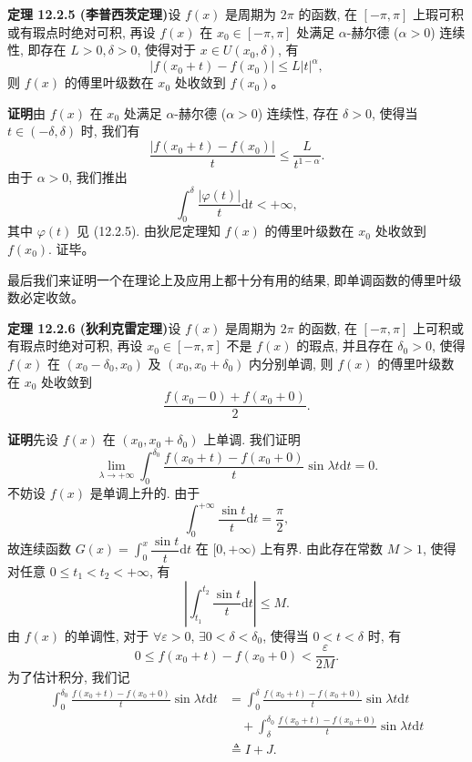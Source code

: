 \documentclass[UTF8, 12pt, fontset=fandol, oneside]{ctexart}
\begin{document}
\noindent\textbf{定理 12.2.5 (李普西茨定理)}\quad 设 $f(x)$ 是周期为 $2\pi$ 的函数, 在 $[-\pi,\pi]$ 上瑕可积或有瑕点时绝对可积, 再设 $f(x)$ 在 $x_0\in[-\pi,\pi]$ 处满足 $\alpha$-赫尔德 ($\alpha>0$) 连续性, 即存在 $L>0,\delta>0$, 使得对于 $x\in U(x_0,\delta)$, 有
\[
  |f(x_0+t)-f(x_0)|\leqslant L|t|^\alpha,
\]
则 $f(x)$ 的傅里叶级数在 $x_0$ 处收敛到 $f(x_0)$。

\noindent\textbf{证明}\quad 由 $f(x)$ 在 $x_0$ 处满足 $\alpha$-赫尔德 ($\alpha>0$) 连续性, 存在 $\delta>0$, 使得当 $t\in(-\delta,\delta)$ 时, 我们有
\[
  \frac{|f(x_0+t)-f(x_0)|}{t}\leqslant\frac{L}{t^{1-\alpha}}.
\]
由于 $\alpha>0$, 我们推出
\[
  \int_0^\delta\frac{|\varphi(t)|}{t}\mathrm dt<+\infty,
\]
其中 $\varphi(t)$ 见 (12.2.5). 由狄尼定理知 $f(x)$ 的傅里叶级数在 $x_0$ 处收敛到 $f(x_0)$. 证毕。

最后我们来证明一个在理论上及应用上都十分有用的结果, 即单调函数的傅里叶级数必定收敛。

\noindent\textbf{定理 12.2.6 (狄利克雷定理)}\quad 设 $f(x)$ 是周期为 $2\pi$ 的函数, 在 $[-\pi,\pi]$ 上可积或有瑕点时绝对可积, 再设 $x_0\in[-\pi,\pi]$ 不是 $f(x)$ 的瑕点, 并且存在 $\delta_0>0$, 使得 $f(x)$ 在 $(x_0-\delta_0,x_0)$ 及 $(x_0,x_0+\delta_0)$ 内分别单调, 则 $f(x)$ 的傅里叶级数在 $x_0$ 处收敛到
\[
  \frac{f(x_0-0)+f(x_0+0)}{2}.
\]

\noindent\textbf{证明}\quad 先设 $f(x)$ 在 $(x_0,x_0+\delta_0)$ 上单调. 我们证明
\begin{equation}
  \lim_{\lambda\to+\infty}\int_0^{\delta_0}
  \frac{f(x_0+t)-f(x_0+0)}{t}\sin\lambda t\mathrm dt=0.
  \tag{12.2.6}
\end{equation}
不妨设 $f(x)$ 是单调上升的. 由于
\[
  \int_0^{+\infty}\frac{\sin t}{t}\mathrm dt=\frac{\pi}{2},
\]
故连续函数 $G(x)=\displaystyle\int_0^x\dfrac{\sin t}{t}\mathrm dt$ 在 $[0,+\infty)$ 上有界. 由此存在常数 $M>1$, 使得对任意 $0\leqslant t_1<t_2<+\infty$, 有
\[
  \left|\int_{t_1}^{t_2}\frac{\sin t}{t}\mathrm dt\right|\leqslant M.
\]
由 $f(x)$ 的单调性, 对于 $\forall\varepsilon>0$, $\exists 0<\delta<\delta_0$, 使得当 $0<t<\delta$ 时, 有
\[
  0\leqslant f(x_0+t)-f(x_0+0)<\frac{\varepsilon}{2M}.
\]
为了估计积分, 我们记
\[
\begin{aligned}
  \int_0^{\delta_0}\frac{f(x_0+t)-f(x_0+0)}{t}\sin\lambda t\mathrm dt
  &=
  \int_0^\delta\frac{f(x_0+t)-f(x_0+0)}{t}\sin\lambda t\mathrm dt\\
  &\quad+
  \int_\delta^{\delta_0}\frac{f(x_0+t)-f(x_0+0)}{t}\sin\lambda t\mathrm dt\\
  &\triangleq I+J.
\end{aligned}
\]
\end{document}
